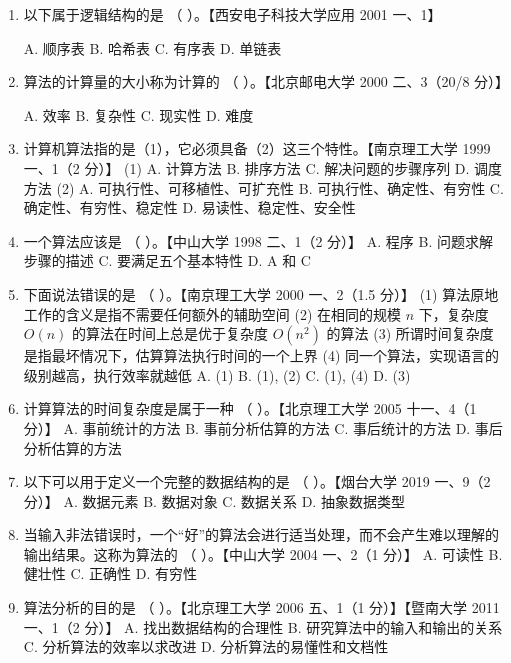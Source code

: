 \documentclass[lang=cn,newtx,10pt,scheme=chinese]{elegantbook}
\begin{document}
\begin{enumerate}
    \item 以下属于逻辑结构的是 （ \quad）。【西安电子科技大学应用 2001 一、1】  
    
    A. 顺序表  
    B. 哈希表  
    C. 有序表  
    D. 单链表  

    \item 算法的计算量的大小称为计算的 （ \quad）。【北京邮电大学 2000 二、3（20/8 分）】  
    
    A. 效率  
    B. 复杂性  
    C. 现实性  
    D. 难度  

    \item 计算机算法指的是（1），它必须具备（2）这三个特性。【南京理工大学 1999 一、1（2 分）】  
    (1)  
    A. 计算方法 \quad B. 排序方法 \quad C. 解决问题的步骤序列 \quad D. 调度方法  
    (2)  
    A. 可执行性、可移植性、可扩充性 \quad B. 可执行性、确定性、有穷性  
    C. 确定性、有穷性、稳定性 \quad D. 易读性、稳定性、安全性  

    \item 一个算法应该是 （ \quad）。【中山大学 1998 二、1（2 分）】  
    A. 程序 \quad B. 问题求解步骤的描述 \quad C. 要满足五个基本特性 \quad D. A 和 C  

    \item 下面说法错误的是 （ \quad）。【南京理工大学 2000 一、2（1.5 分）】  
    (1) 算法原地工作的含义是指不需要任何额外的辅助空间  
    (2) 在相同的规模 $n$ 下，复杂度 $O(n)$ 的算法在时间上总是优于复杂度 $O(n^2)$ 的算法  
    (3) 所谓时间复杂度是指最坏情况下，估算算法执行时间的一个上界  
    (4) 同一个算法，实现语言的级别越高，执行效率就越低  
    A. (1) \quad B. (1), (2) \quad C. (1), (4) \quad D. (3)  

    \item 计算算法的时间复杂度是属于一种 （ \quad）。【北京理工大学 2005 十一、4（1 分）】  
    A. 事前统计的方法 \quad B. 事前分析估算的方法  
    C. 事后统计的方法 \quad D. 事后分析估算的方法  

    \item 以下可以用于定义一个完整的数据结构的是 （ \quad）。【烟台大学 2019 一、9（2 分）】  
    A. 数据元素 \quad B. 数据对象 \quad C. 数据关系 \quad D. 抽象数据类型  

    \item 当输入非法错误时，一个“好”的算法会进行适当处理，而不会产生难以理解的输出结果。这称为算法的 （ \quad）。【中山大学 2004 一、2（1 分）】  
    A. 可读性 \quad B. 健壮性 \quad C. 正确性 \quad D. 有穷性  

    \item 算法分析的目的是 （ \quad）。【北京理工大学 2006 五、1（1 分）】【暨南大学 2011 一、1（2 分）】  
    A. 找出数据结构的合理性  
    B. 研究算法中的输入和输出的关系  
    C. 分析算法的效率以求改进  
    D. 分析算法的易懂性和文档性  


\end{enumerate}
\end{document}
